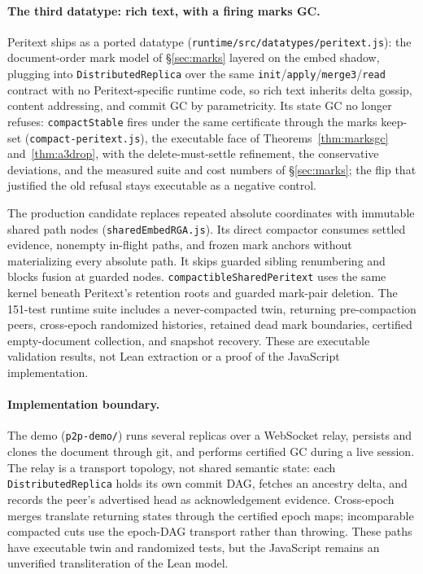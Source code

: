 \documentclass[11pt]{article}
\newcommand{\code}[1]{\texttt{#1}}
\begin{document}
\paragraph{The third datatype: rich text, with a firing marks GC.}
Peritext ships as a ported datatype
(\code{runtime/src/datatypes/peritext.js}): the document-order mark
model of \S\ref{sec:marks} layered on the embed shadow, plugging into
\code{DistributedReplica} over the same
\code{init}/\code{apply}/\code{merge3}/\code{read} contract with no
Peritext-specific runtime code, so rich text inherits delta gossip,
content addressing, and commit GC by parametricity. Its state GC no
longer refuses: \code{compactStable} fires under the same certificate
through the marks keep-set (\code{compact-peritext.js}), the executable
face of Theorems~\ref{thm:marksgc} and~\ref{thm:a3drop}, with the
delete-must-settle refinement, the conservative deviations, and the
measured suite and cost numbers of \S\ref{sec:marks}; the flip that
justified the old refusal stays executable as a negative control.

The production candidate replaces repeated absolute coordinates with immutable
shared path nodes (\code{sharedEmbedRGA.js}). Its direct compactor consumes
settled evidence, nonempty in-flight paths, and frozen mark anchors without
materializing every absolute path. It skips guarded sibling renumbering and
blocks fusion at guarded nodes. \code{compactibleSharedPeritext} uses the same
kernel beneath Peritext's retention roots and guarded mark-pair deletion. The
151-test runtime suite includes a never-compacted twin, returning
pre-compaction peers, cross-epoch randomized histories, retained dead mark
boundaries, certified empty-document collection, and snapshot recovery. These
are executable validation results, not Lean extraction or a proof of the
JavaScript implementation.

\paragraph{Implementation boundary.} The demo (\code{p2p-demo/}) runs
several replicas over a WebSocket relay, persists and clones the document
through git, and performs certified GC during a live session. The relay is a
transport topology, not shared semantic state: each \code{DistributedReplica}
holds its own commit DAG, fetches an ancestry delta, and records the peer's
advertised head as acknowledgement evidence. Cross-epoch merges translate
returning states through the certified epoch maps; incomparable compacted cuts
use the epoch-DAG transport rather than throwing. These paths have executable
twin and randomized tests, but the JavaScript remains an unverified
transliteration of the Lean model.
\end{document}
